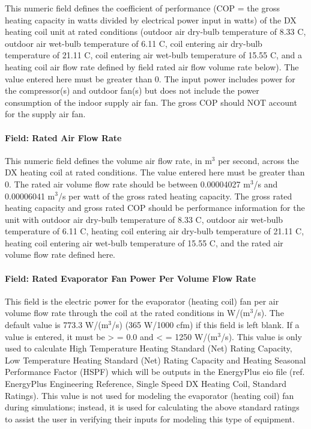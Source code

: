 This numeric field defines the coefficient of performance (COP = the gross heating capacity in watts divided by electrical power input in watts) of the DX heating coil unit at rated conditions (outdoor air dry-bulb temperature of 8.33 C, outdoor air wet-bulb temperature of 6.11 C, coil entering air dry-bulb temperature of 21.11 C, coil entering air wet-bulb temperature of 15.55 C, and a heating coil air flow rate defined by field rated air flow volume rate below). The value entered here must be greater than 0. The input power includes power for the compressor(s) and outdoor fan(s) but does not include the power consumption of the indoor supply air fan. The gross COP should NOT account for the supply air fan.

\paragraph{Field: Rated Air Flow Rate}\label{field-rated-air-flow-rate-4}

This numeric field defines the volume air flow rate, in m\(^{3}\) per second, across the DX heating coil at rated conditions. The value entered here must be greater than 0. The rated air volume flow rate should be between 0.00004027 m\(^{3}\)/s and 0.00006041 m\(^{3}\)/s per watt of the gross rated heating capacity. The gross rated heating capacity and gross rated COP should be performance information for the unit with outdoor air dry-bulb temperature of 8.33 C, outdoor air wet-bulb temperature of 6.11 C, heating coil entering air dry-bulb temperature of 21.11 C, heating coil entering air wet-bulb temperature of 15.55 C, and the rated air volume flow rate defined here.

\paragraph{Field: Rated Evaporator Fan Power Per Volume Flow Rate}\label{field-rated-evaporator-fan-power-per-volume-flow-rate-1}

This field is the electric power for the evaporator (heating coil) fan per air volume flow rate through the coil at the rated conditions in W/(m\(^{3}\)/s). The default value is 773.3 W/(m\(^{3}\)/s) (365 W/1000 cfm) if this field is left blank. If a value is entered, it must be \textgreater{} = 0.0 and \textless{} = 1250 W/(m\(^{3}\)/s). This value is only used to calculate High Temperature Heating Standard (Net) Rating Capacity, Low Temperature Heating Standard (Net) Rating Capacity and Heating Seasonal Performance Factor (HSPF) which will be outputs in the EnergyPlus eio file (ref. EnergyPlus Engineering Reference, Single Speed DX Heating Coil, Standard Ratings). This value is not used for modeling the evaporator (heating coil) fan during simulations; instead, it is used for calculating the above standard ratings to assist the user in verifying their inputs for modeling this type of equipment.

